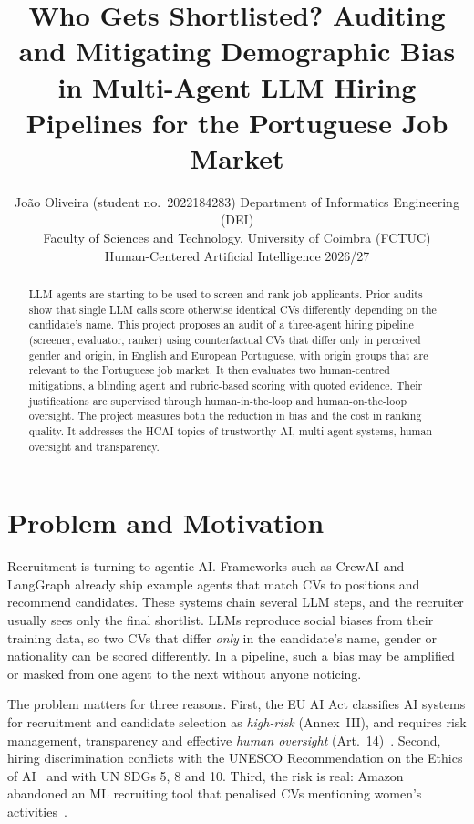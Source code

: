 \documentclass{article}
\title{Who Gets Shortlisted? Auditing and Mitigating Demographic Bias\\
in Multi-Agent LLM Hiring Pipelines for the Portuguese Job Market}
\author{
    Jo\~{a}o Oliveira (student no.\ 2022184283)
    \affiliations
    Department of Informatics Engineering (DEI)\\
    Faculty of Sciences and Technology, University of Coimbra (FCTUC)\\
    Human-Centered Artificial Intelligence 2026/27
}
\begin{document}
\maketitle

\begin{abstract}
LLM agents are starting to be used to screen and rank job applicants. Prior audits show that single LLM calls score otherwise identical CVs differently depending on the candidate's name. This project proposes an audit of a three-agent hiring pipeline (screener, evaluator, ranker) using counterfactual CVs that differ only in perceived gender and origin, in English and European Portuguese, with origin groups that are relevant to the Portuguese job market. It then evaluates two human-centred mitigations, a blinding agent and rubric-based scoring with quoted evidence. Their justifications are supervised through human-in-the-loop and human-on-the-loop oversight. The project measures both the reduction in bias and the cost in ranking quality. It addresses the HCAI topics of trustworthy AI, multi-agent systems, human oversight and transparency.
\end{abstract}

\section{Problem and Motivation}

Recruitment is turning to agentic AI. Frameworks such as CrewAI and LangGraph already ship example agents that match CVs to positions and recommend candidates. These systems chain several LLM steps, and the recruiter usually sees only the final shortlist. LLMs reproduce social biases from their training data, so two CVs that differ \emph{only} in the candidate's name, gender or nationality can be scored differently. In a pipeline, such a bias may be amplified or masked from one agent to the next without anyone noticing.

The problem matters for three reasons. First, the EU AI Act classifies AI systems for recruitment and candidate selection as \emph{high-risk} (Annex~III), and requires risk management, transparency and effective \emph{human oversight} (Art.~14)~\cite{euaiact2024}. Second, hiring discrimination conflicts with the UNESCO Recommendation on the Ethics of AI~\cite{unesco2021ethics} and with UN SDGs 5, 8 and 10. Third, the risk is real: Amazon abandoned an ML recruiting tool that penalised CVs mentioning women's activities~\cite{dastin2018amazon}.
\end{document}
